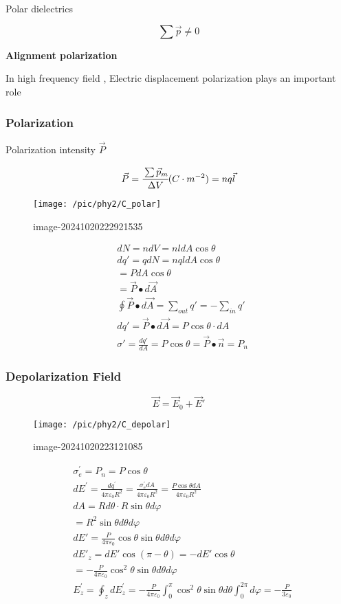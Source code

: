 \documentclass[
]{article}
\begin{document}
Polar dielectrics

\[
\sum \vec p\neq 0
\]

\textbf{Alignment polarization}

In high frequency field , Electric displacement polarization plays an
important role

\hypertarget{polarization}{%
\subsubsection{Polarization}\label{polarization}}

Polarization intensity \(\vec P\)

\[
\vec P=\cfrac{\sum  \vec p_m}{\Delta V} (C\cdot m^{-2})=nq \vec l
\]

\begin{figure}
\centering
\texttt{[image: /pic/phy2/C\_polar]}
\caption{image-20241020222921535}
\end{figure}

\[
\begin{aligned}
&dN=ndV=nldA\cos\theta \\
&dq'=qdN=nqldA\cos\theta \\
&=PdA\cos\theta \\
&=\vec{P}\bullet d\vec{A} \\
&\oint\vec{P}\bullet d\vec{A}=\sum_{out}q'=-\sum_{in}q'\\
&dq'=\vec{P}\bullet d\vec{A}=P\cos\theta\cdot dA\\&\sigma'=\frac{dq'}{dA}=P\cos\theta=\vec{P}\bullet\vec{n}=P_n
\end{aligned}
\]

\hypertarget{depolarization-field}{%
\subsubsection{Depolarization Field}\label{depolarization-field}}

\[
\vec E=\vec E_0+\vec E'
\]

\begin{figure}
\centering
\texttt{[image: /pic/phy2/C\_depolar]}
\caption{image-20241020223121085}
\end{figure}

\[
\begin{aligned}
&\sigma_e^{\prime}=P_n=P\cos\theta \\
&dE^{\prime}=\frac{dq^{\prime}}{4\pi\varepsilon_0R^2}=\frac{\sigma_e^{\prime}dA}{4\pi\varepsilon_0R^2}=\frac{P\cos\theta dA}{4\pi\varepsilon_0R^2} \\
&dA=Rd\theta\cdot R\sin\theta d\varphi \\
&=R^{2}\sin\theta d\theta d\varphi \\
&dE'=\frac P{4\pi\varepsilon_0}\cos\theta\sin\theta d\theta d\varphi \\
&dE'_z=dE'\cos(\pi-\theta)=-dE'\cos\theta \\
&=-\frac P{4\pi\varepsilon_0}\cos^2\theta\sin\theta d\theta d\varphi \\
&E_z^{\prime}=\oint_zdE_z^{\prime}=-\frac P{4\pi\varepsilon_0}\int_0^\pi\cos^2\theta\sin\theta d\theta\int_0^{2\pi}d\varphi=-\frac P{3\varepsilon_0}
\end{aligned}
\]
\end{document}
